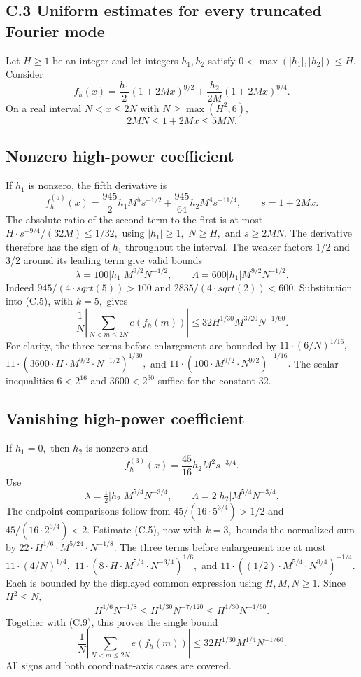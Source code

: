 \documentclass[11pt,a4paper]{article}
\begin{document}
\subsection{C.3 Uniform estimates for every truncated Fourier
mode}\label{c.3-uniform-estimates-for-every-truncated-fourier-mode}

Let \(H\ge 1\) be an integer and let integers \(h_1,h_2\) satisfy
\(0<\max(|h_1|,|h_2|)\le H.\) Consider \[
f_h(x)=\frac{h_1}{2}(1+2Mx)^{9/2}
       +\frac{h_2}{2M}(1+2Mx)^{9/4}. \tag{C.6}
\] On a real interval \(N<x\le 2N\) with \(N\ge \max(H^2,6),\) \[
2MN\le1+2Mx\le5MN. \tag{C.7}
\]

\subsection{Nonzero high-power
coefficient}\label{nonzero-high-power-coefficient}

If \(h_1\) is nonzero, the fifth derivative is \[
f_h^{(5)}(x)=\frac{945}{2}h_1M^5s^{-1/2}
             +\frac{945}{64}h_2M^4s^{-11/4},\qquad s=1+2Mx.
\] The absolute ratio of the second term to the first is at most
\(H\cdot s^{-9/4}/(32M)\le 1/32,\) using \(|h_1|\ge 1,\) \(N\ge H,\) and
\(s\ge 2MN.\) The derivative therefore has the sign of \(h_1\)
throughout the interval. The weaker factors 1/2 and 3/2 around its
leading term give valid bounds \[
\lambda=100|h_1|M^{9/2}N^{-1/2},\qquad
\Lambda=600|h_1|M^{9/2}N^{-1/2}. \tag{C.8}
\] Indeed \(945/(4\cdot sqrt(5))>100\) and
\(2835/(4\cdot sqrt(2))<600.\) Substitution into (C.5), with \(k=5,\)
gives \[
\frac1N\left|\sum_{N<m\le2N}e(f_h(m))\right|
\le32H^{1/30}M^{3/20}N^{-1/60}. \tag{C.9}
\] For clarity, the three terms before enlargement are bounded by
\(11\cdot (6/N)^{1/16},\)
\(11\cdot (3600\cdot H\cdot M^{9/2}\cdot N^{-1/2})^{1/30},\) and
\(11\cdot (100\cdot M^{9/2}\cdot N^{9/2})^{-1/16}.\) The scalar
inequalities \(6<2^16\) and \(3600<2^30\) suffice for the constant 32.

\subsection{Vanishing high-power
coefficient}\label{vanishing-high-power-coefficient}

If \(h_1=0,\) then \(h_2\) is nonzero and \[
f_h^{(3)}(x)=\frac{45}{16}h_2M^2s^{-3/4}.
\] Use \[
\lambda=\tfrac12|h_2|M^{5/4}N^{-3/4},\qquad
\Lambda=2|h_2|M^{5/4}N^{-3/4}.
\] The endpoint comparisons follow from \(45/(16\cdot 5^{3/4})>1/2\) and
\(45/(16\cdot 2^{3/4})<2.\) Estimate (C.5), now with \(k=3,\) bounds the
normalized sum by \(22\cdot H^{1/6}\cdot M^{5/24}\cdot N^{-1/8}.\) The
three terms before enlargement are at most \(11\cdot (4/N)^{1/4},\)
\(11\cdot (8\cdot H\cdot M^{5/4}\cdot N^{-3/4})^{1/6},\) and
\(11\cdot ((1/2)\cdot M^{5/4}\cdot N^{9/4})^{-1/4}.\) Each is bounded by
the displayed common expression using \(H,M,N\ge 1.\) Since
\(H^2\le N,\) \[
H^{1/6}N^{-1/8}
\le H^{1/30}N^{-7/120}
\le H^{1/30}N^{-1/60}.
\] Together with (C.9), this proves the single bound \[
\frac1N\left|\sum_{N<m\le2N}e(f_h(m))\right|
\le32H^{1/30}M^{1/4}N^{-1/60}. \tag{C.10}
\] All signs and both coordinate-axis cases are covered.
\end{document}

